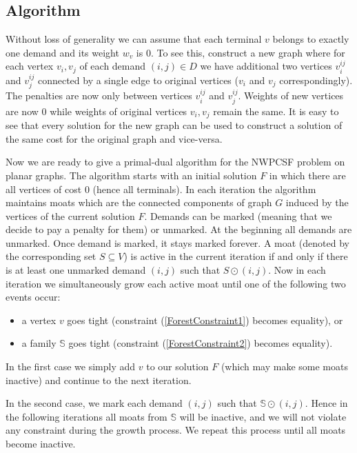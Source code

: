 \subsection{Algorithm}
Without loss of generality we can assume that each terminal $v$ belongs to exactly one demand and its weight $w_v$ is $0$. To see this, construct a new graph where for each vertex $v_i, v_j$ of each demand $(i,j) \in D$ we have additional two vertices $v_i^{ij}$ and $v_j^{ij}$ connected by a single edge to original vertices ($v_i$ and $v_j$ correspondingly). The penalties are now only between vertices $v_i^{ij}$ and $v_j^{ij}$. Weights of new vertices are now $0$ while weights of original vertices $v_i, v_j$ remain the same. It is easy to see that every solution for the new graph can be used to construct a solution of the same cost for the original graph and vice-versa.

Now we are ready to give a primal-dual algorithm for the NWPCSF problem on planar graphs.
The algorithm starts with an initial solution $F$ in which there are all vertices of cost $0$ (hence all terminals). In each iteration the algorithm maintains moats which are the connected components of graph $G$ induced by the vertices of the current solution $F$. Demands can be marked (meaning that we decide to pay a penalty for them) or unmarked. At the beginning all demands are unmarked. Once demand is marked, it stays marked forever. A moat (denoted by the corresponding set $S\subseteq V$) is active in the current iteration if and only if there is at least one unmarked demand $(i,j)$ such that $S \odot (i,j)$. Now in each iteration we simultaneously grow each active moat until one of the following two events occur:
\begin{itemize}
	\item a vertex $v$ goes tight (constraint (\ref{ForestConstraint1}) becomes equality), or
	\item a family $\mathbb{S}$ goes tight (constraint (\ref{ForestConstraint2}) becomes equality).
\end{itemize}

In the first case we simply add $v$ to our solution $F$ (which may make some moats inactive) and continue to the next iteration.

In the second case, we mark each demand $(i,j)$ such that $\mathbb{S} \odot (i,j)$. Hence in the following iterations all moats from $\mathbb{S}$ will be inactive, and we will not violate any constraint during the growth process. We repeat this process until all moats become inactive.

